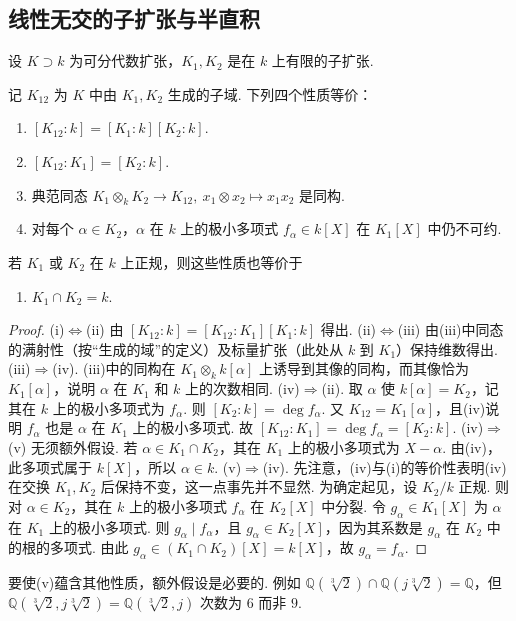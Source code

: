 \subsection{线性无交的子扩张与半直积}\label{sec:galois-2-7-9}
设 $K\supset k$ 为可分代数扩张，$K_1,K_2$ 是在 $k$ 上有限的子扩张.
\begin{proposition*}记 $K_{12}$ 为 $K$ 中由 $K_1,K_2$ 生成的子域. 下列四个性质等价：
\begin{enumerate}[label=\roman*)]
\item $[K_{12}:k]=[K_1:k][K_2:k]$.
\item $[K_{12}:K_1]=[K_2:k]$.
\item 典范同态 $K_1\otimes_kK_2\to K_{12},\ x_1\otimes x_2\mapsto x_1x_2$ 是同构.
\item 对每个 $\alpha\in K_2$，$\alpha$ 在 $k$ 上的极小多项式 $f_\alpha\in k[X]$ 在 $K_1[X]$ 中仍不可约.
\end{enumerate}
若 $K_1$ 或 $K_2$ 在 $k$ 上正规，则这些性质也等价于
\begin{enumerate}[label=\roman*),start=5]\item $K_1\cap K_2=k$.\end{enumerate}
\end{proposition*}
\begin{proof}(i)$\Leftrightarrow$(ii) 由 $[K_{12}:k]=[K_{12}:K_1][K_1:k]$ 得出. (ii)$\Leftrightarrow$(iii) 由(iii)中同态的满射性（按``生成的域''的定义）及标量扩张（此处从 $k$ 到 $K_1$）保持维数得出.
(iii)$\Rightarrow$(iv). (iii)中的同构在 $K_1\otimes_k k[\alpha]$ 上诱导到其像的同构，而其像恰为 $K_1[\alpha]$，说明 $\alpha$ 在 $K_1$ 和 $k$ 上的次数相同.
(iv)$\Rightarrow$(ii). 取 $\alpha$ 使 $k[\alpha]=K_2$，记其在 $k$ 上的极小多项式为 $f_\alpha$. 则 $[K_2:k]=\deg f_\alpha$. 又 $K_{12}=K_1[\alpha]$，且(iv)说明 $f_\alpha$ 也是 $\alpha$ 在 $K_1$ 上的极小多项式. 故 $[K_{12}:K_1]=\deg f_\alpha=[K_2:k]$.
(iv)$\Rightarrow$(v) 无须额外假设. 若 $\alpha\in K_1\cap K_2$，其在 $K_1$ 上的极小多项式为 $X-\alpha$. 由(iv)，此多项式属于 $k[X]$，所以 $\alpha\in k$.
(v)$\Rightarrow$(iv). 先注意，(iv)与(i)的等价性表明(iv)在交换 $K_1,K_2$ 后保持不变，这一点事先并不显然. 为确定起见，设 $K_2/k$ 正规. 则对 $\alpha\in K_2$，其在 $k$ 上的极小多项式 $f_\alpha$ 在 $K_2[X]$ 中分裂. 令 $g_\alpha\in K_1[X]$ 为 $\alpha$ 在 $K_1$ 上的极小多项式. 则 $g_\alpha\mid f_\alpha$，且 $g_\alpha\in K_2[X]$，因为其系数是 $g_\alpha$ 在 $K_2$ 中的根的多项式. 由此 $g_\alpha\in(K_1\cap K_2)[X]=k[X]$，故 $g_\alpha=f_\alpha$.\end{proof}
\begin{remark*}要使(v)蕴含其他性质，额外假设是必要的. 例如 $\mathbb Q(\sqrt[3]2)\cap\mathbb Q(j\sqrt[3]2)=\mathbb Q$，但 $\mathbb Q(\sqrt[3]2,j\sqrt[3]2)=\mathbb Q(\sqrt[3]2,j)$ 次数为 $6$ 而非 $9$.\end{remark*}
